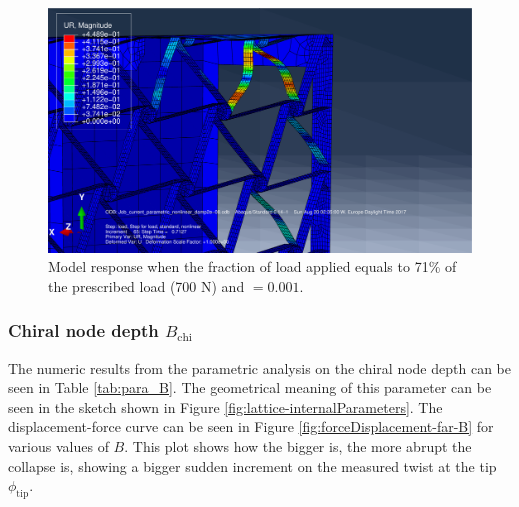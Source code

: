       \begin{figure}[!htpb] %
        \centering
        \includegraphics[width=0.8 \textwidth]{../figures/result-sim/eccen/0coma001_UR}
        \caption[Model response when the fraction of load applied equals to 71\% of the prescribed load (700 N) and \chie$= 0.001$]{Model response when the fraction of load applied equals to 71\% of the prescribed load (700 N) and \chie$= 0.001$.}
        \label{fig:0coma001_UR}
      \end{figure}

    \clearpage
    \subsubsection{Chiral node depth $B_{\mathrm{chi}}$}

      The numeric results from the parametric analysis on the chiral node depth \chiB can be seen in Table \ref{tab:para_B}. The geometrical meaning of this parameter can be seen in the sketch shown in Figure \ref{fig:lattice-internalParameters}. The displacement-force curve can be seen in Figure \ref{fig:forceDisplacement-far-B} for various values of $B$. This plot shows how the bigger \chiB is, the more abrupt the collapse is, showing a bigger sudden increment on the measured twist at the tip $\phi_{\mathrm{tip}}$.

